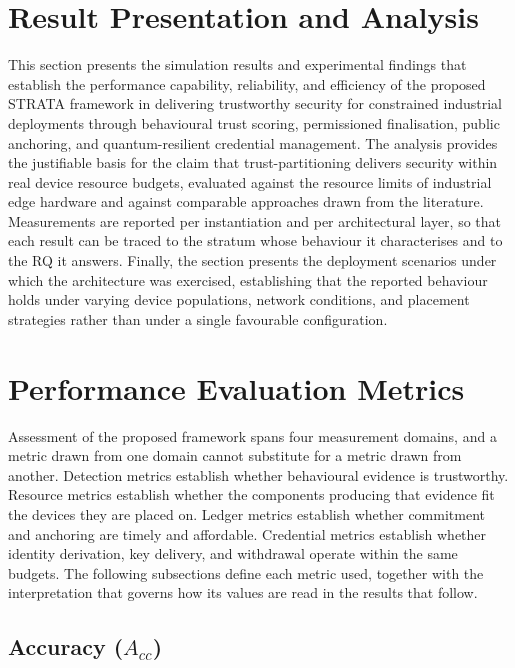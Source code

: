 \Large
\label{Chapter_5}

\section{Result Presentation and Analysis}
\label{sec:eval-presentation}

This section presents the simulation results and experimental findings that establish the performance capability, reliability, and efficiency of the proposed STRATA framework in delivering trustworthy security for constrained industrial deployments through behavioural trust scoring, permissioned finalisation, public anchoring, and quantum-resilient credential management. The analysis provides the justifiable basis for the claim that trust-partitioning delivers security within real device resource budgets, evaluated against the resource limits of industrial edge hardware and against comparable approaches drawn from the literature. Measurements are reported per instantiation and per architectural layer, so that each result can be traced to the stratum whose behaviour it characterises and to the RQ it answers. Finally, the section presents the deployment scenarios under which the architecture was exercised, establishing that the reported behaviour holds under varying device populations, network conditions, and placement strategies rather than under a single favourable configuration.

\section{Performance Evaluation Metrics}
\label{sec:eval-metrics}

Assessment of the proposed framework spans four measurement domains, and a metric drawn from one domain cannot substitute for a metric drawn from another. Detection metrics establish whether behavioural evidence is trustworthy. Resource metrics establish whether the components producing that evidence fit the devices they are placed on. Ledger metrics establish whether commitment and anchoring are timely and affordable. Credential metrics establish whether identity derivation, key delivery, and withdrawal operate within the same budgets. The following subsections define each metric used, together with the interpretation that governs how its values are read in the results that follow.

\subsection{Accuracy ($A_{cc}$)}
\label{sec:metric-accuracy}

